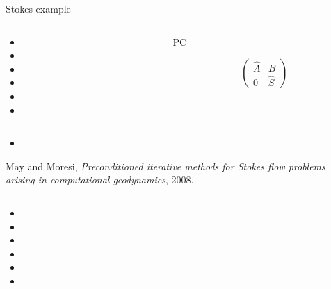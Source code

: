 \begin{frame}[fragile]{Stokes example}
\begin{overprint}
%
\begin{columns}
\begin{column}[t]{0.67\textwidth}
\begin{itemize}
  \item[] 
  \item[] 
  \medskip
  \item[] 
  \item[] 
  \medskip
  \item[] 
  \item[] 
\end{itemize}
\end{column}
\begin{column}[t]{0.33\textwidth}
\Huge\begin{center}PC\end{center}
\begin{equation*}
\begin{pmatrix}
\hat A & B \\
     0 & \hat S
\end{pmatrix}
\end{equation*}
\end{column}
\end{columns}
\begin{itemize}
  \item[] 
\end{itemize}
\scriptsize
  May and Moresi, \emph{Preconditioned iterative methods for Stokes flow problems arising in computational geodynamics}, 2008.
%
\begin{columns}
\begin{column}[t]{0.67\textwidth}
\begin{itemize}
  \item[] 
  \item[] 
  \medskip
  \item[] 
  \item[] 
  \medskip
  \item[] 
  \item[] 
\end{itemize}
\end{column}

\end{columns}
\end{overprint}
\end{frame}

